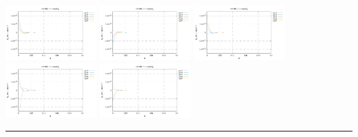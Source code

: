 \noindent
\includegraphics[width=3.5cm]{python_codes/fieldstone_152/RESULTS/exp1/err_128_m2}
\includegraphics[width=3.5cm]{python_codes/fieldstone_152/RESULTS/exp1/err_128_m3}
\includegraphics[width=3.5cm]{python_codes/fieldstone_152/RESULTS/exp1/err_128_m4}
\includegraphics[width=3.5cm]{python_codes/fieldstone_152/RESULTS/exp1/err_128_m5}
\includegraphics[width=3.5cm]{python_codes/fieldstone_152/RESULTS/exp1/err_128_m6}

\hrule


